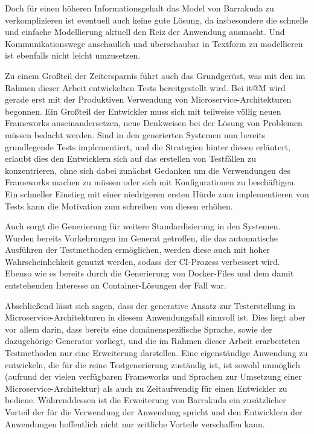 \documentclass[12pt,a4paper,bibliography=totocnumbered,listof=totocnumbered]{scrartcl}
\begin{document}
Doch für einen höheren Informationsgehalt das Model von Barrakuda zu verkomplizieren ist eventuell auch keine gute Lösung, da insbesondere die schnelle und einfache Modellierung aktuell den Reiz der Anwendung ausmacht. Und Kommunikationswege anschaulich und überschaubar in Textform zu modellieren ist ebenfalls nicht leicht umzusetzen.

Zu einem Großteil der Zeitersparnis führt auch das Grundgerüst, was mit den im Rahmen dieser Arbeit entwickelten Tests bereitgestellt wird. Bei it@M wird gerade erst mit der Produktiven Verwendung von Microservice-Architekturen begonnen. Ein Großteil der Entwickler muss sich mit teilweise völlig neuen Frameworks auseinandersetzen, neue Denkweisen bei der Lösung von Problemen müssen bedacht werden. Sind in den generierten Systemen nun bereits grundlegende Tests implementiert, und die Strategien hinter diesen erläutert, erlaubt dies den Entwicklern sich auf das erstellen von Testfällen zu konzentrieren, ohne sich dabei zunächst Gedanken um die Verwendungen des Frameworks machen zu müssen oder sich mit Konfigurationen zu beschäftigen. Ein schneller Einstieg mit einer niedrigeren ersten Hürde zum implementieren von Tests kann die Motivation zum schreiben von diesen erhöhen.

Auch sorgt die Generierung für weitere Standardisierung in den Systemen. Wurden bereits Vorkehrungen im Generat getroffen, die das automatische Ausführen der Testmethoden ermöglichen, werden diese auch mit hoher Wahrscheinlichkeit genutzt werden, sodass der \acs{CI}-Prozess verbessert wird. Ebenso wie es bereits durch die Generierung von Docker-Files und dem damit entstehenden Interesse an Container-Lösungen der Fall war.

Abschließend lässt sich sagen, dass der generative Ansatz zur Testerstellung in Microservice-Architekturen in diesem Anwendungsfall sinnvoll ist. Dies liegt aber vor allem darin, dass bereits eine domänenspezifische Sprache, sowie der dazugehörige Generator vorliegt, und die im Rahmen dieser Arbeit erarbeiteten Testmethoden nur eine Erweiterung darstellen. Eine eigenständige Anwendung zu entwickeln, die für die reine Testgenerierung zuständig ist, ist sowohl unmöglich (aufrund der vielen verfügbaren Frameworks und Sprachen zur Umsetzung einer Microservice-Architektur) als auch zu Zeitaufwendig für einen Entwickler zu bediene. Währenddessen ist die Erweiterung von Barrakuda ein zusätzlicher Vorteil der für die Verwendung der Anwendung spricht und den Entwicklern der Anwendungen hoffentlich nicht nur zeitliche Vorteile verschaffen kann.

\renewcommand\refname{Quellenverzeichnis}


\pagebreak

\setcounter{page}{1}
\end{document}
